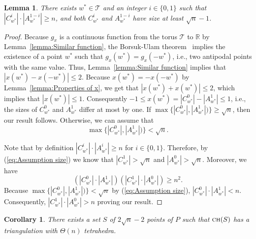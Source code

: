 \documentclass[a4paper, 11pt]{article}
\newtheorem{corollary}[theorem]{Corollary}
\newtheorem{lemma}[theorem]{Lemma}
\newcommand{\we}{{\ensuremath{w}}}
\newcommand{\ch}[1]{\ensuremath{\textsc{ch}(#1)}}
\newcommand{\torus}{\ensuremath{\mathcal T}}
\begin{document}
\begin{lemma}
There exists $\we^*\in \torus$ and an integer $i\in \{0, 1\}$ such that 
$|C^i_{\we^*}| \cdot |A^{1-i}_{\we^*}| \geq n$, and both $C^i_{\we^*}$ and $A^{1-i}_{\we^*}$ have size  at least $\sqrt{n}-1$.
\end{lemma}
\begin{proof}
Because $g_x$ is a continuous function from the torus $\torus$ to $\mathbb{R}$ by Lemma~\ref{lemma:Similar function}, the Borsuk-Ulam theorem~\cite{?} implies the existence of a point $\we^*$ such that $g_x(\we^*) = g_x(-\we^*)$, i.e., two antipodal points with the same value.
Thus, Lemma~\ref{lemma:Similar function} implies that $|x(\we^*) - x(-\we^*)| \leq 2$. 
Because $x(\we^*) = - x(-\we^*)$ by Lemma~\ref{lemma:Properties of x}, 
we get that $|x(\we^*) + x(\we^*)| \leq 2$, which implies that $|x(\we^*)|\leq 1$. Consequently $-1\leq x(\we^*) = |C^0_{\we^*}| - |A^1_{\we^*}| \leq 1$, i.e., the sizes of $C^0_{\we^*}$ and $A^1_{\we^*}$ differ at most by one.
If $\max\{|C^0_{\we^*}|, |A^1_{\we^*}|)\} \geq \sqrt{n}$, then our result follows. Otherwise, we can assume that 
\begin{equation}\label{eq:Assumption size}
\max\{|C^0_{\we^*}|, |A^1_{\we^*}|)\} < \sqrt{n}.
\end{equation}



Note that by definition $|C^i_{\we^*}| \cdot |A^i_{\we^*}| \geq n$ for $i\in \{0, 1\}$. 
Therefore, by (\ref{eq:Assumption size}) we know that $|C^1_{\we^*}| > \sqrt{n}$ and $|A^0_{\we^*}| > \sqrt{n}$.
Moreover, we have 
$$(|C^0_{\we^*}|\cdot |A^1_{\we^*}|) (|C^1_{\we^*}|\cdot |A^0_{\we^*}|) \geq n^2.$$
Because $\max\{|C^0_{\we^*}|, |A^1_{\we^*}|)\} < \sqrt{n}$ by (\ref{eq:Assumption size}), $|C^0_{\we^*}|\cdot |A^1_{\we^*}| < n$. 
Consequently, $|C^1_{\we^*}|\cdot |A^0_{\we^*}| > n$ proving our result.
\end{proof}

\begin{corollary}\label{corollary:Existence of set}
There exists a set $S$ of $2\sqrt{n}-2$ points of $P$ such that $\ch{S}$ has a triangulation with $\Theta(n)$ tetrahedra.
\end{corollary}
\end{document}
